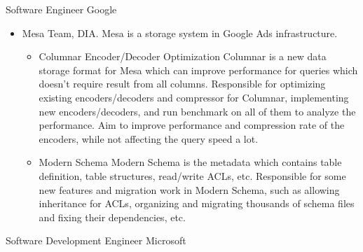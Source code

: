 \documentclass[10pt,a4paper,roman]{moderncv} %
\begin{document}
        {Software Engineer}
        {}
        {Google}
        {}
        {\begin{itemize}%
         \item Mesa Team, DIA.
               Mesa\footnotemark[2]{} is a storage system in Google Ads infrastructure.
               \begin{itemize}%
               \item Columnar Encoder/Decoder Optimization\newline{}%
                     Columnar is a new data storage format for Mesa which can improve performance for queries which doesn't require result from all columns.\newline{}%
                     Responsible for optimizing existing encoders/decoders and compressor for Columnar, implementing new encoders/decoders, and run benchmark on all of them to analyze the performance.\newline{}%
                     Aim to improve performance and compression rate of the encoders, while not affecting the query speed a lot.
               \item Modern Schema\newline{}%
                     Modern Schema is the metadata which contains table definition, table structures, read/write ACLs, etc.\newline{}%
                     Responsible for some new features and migration work in Modern Schema, such as allowing inheritance for ACLs, organizing and migrating thousands of schema files and fixing their dependencies, etc.
               \end{itemize}
         \end{itemize}}
        {Software Development Engineer}
        {}
        {Microsoft}
        {}
\end{document}
